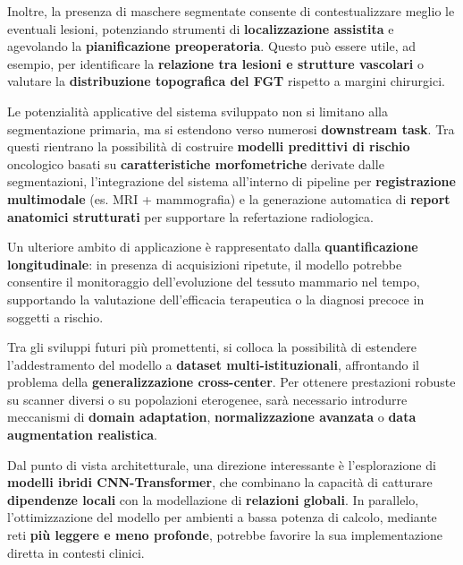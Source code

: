 Inoltre, la presenza di maschere segmentate consente di contestualizzare meglio le eventuali lesioni, potenziando strumenti di \textbf{localizzazione assistita} e agevolando la \textbf{pianificazione preoperatoria}. Questo può essere utile, ad esempio, per identificare la \textbf{relazione tra lesioni e strutture vascolari} o valutare la \textbf{distribuzione topografica del FGT} rispetto a margini chirurgici.


Le potenzialità applicative del sistema sviluppato non si limitano alla segmentazione primaria, ma si estendono verso numerosi \textbf{downstream task}. Tra questi rientrano la possibilità di costruire \textbf{modelli predittivi di rischio} oncologico basati su \textbf{caratteristiche morfometriche} derivate dalle segmentazioni, l’integrazione del sistema all’interno di pipeline per \textbf{registrazione multimodale} (es. MRI + mammografia) e la generazione automatica di \textbf{report anatomici strutturati} per supportare la refertazione radiologica.

Un ulteriore ambito di applicazione è rappresentato dalla \textbf{quantificazione longitudinale}: in presenza di acquisizioni ripetute, il modello potrebbe consentire il monitoraggio dell’evoluzione del tessuto mammario nel tempo, supportando la valutazione dell’efficacia terapeutica o la diagnosi precoce in soggetti a rischio.


Tra gli sviluppi futuri più promettenti, si colloca la possibilità di estendere l’addestramento del modello a \textbf{dataset multi-istituzionali}, affrontando il problema della \textbf{generalizzazione cross-center}. Per ottenere prestazioni robuste su scanner diversi o su popolazioni eterogenee, sarà necessario introdurre meccanismi di \textbf{domain adaptation}, \textbf{normalizzazione avanzata} o \textbf{data augmentation realistica}.

Dal punto di vista architetturale, una direzione interessante è l’esplorazione di \textbf{modelli ibridi CNN-Transformer}, che combinano la capacità di catturare \textbf{dipendenze locali} con la modellazione di \textbf{relazioni globali}. In parallelo, l’ottimizzazione del modello per ambienti a bassa potenza di calcolo, mediante reti \textbf{più leggere e meno profonde}, potrebbe favorire la sua implementazione diretta in contesti clinici.


